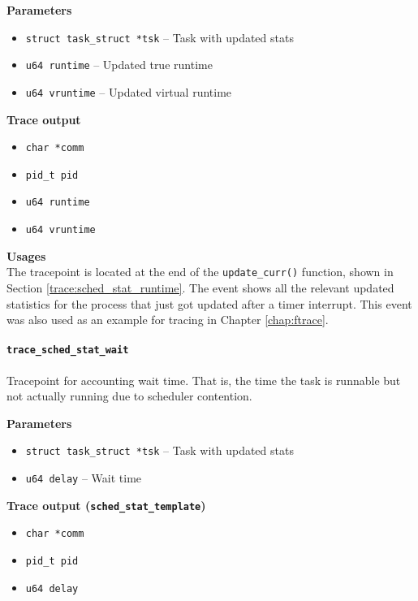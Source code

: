\textbf{Parameters}
\begin{itemize}
    \item \verb|struct task_struct *tsk| -- Task with updated stats
    \item \verb|u64 runtime| -- Updated true runtime
    \item \verb|u64 vruntime| -- Updated virtual runtime
\end{itemize}

\textbf{Trace output}
\begin{itemize}
    \item \verb|char *comm|
    \item \verb|pid_t pid|
    \item \verb|u64 runtime|
    \item \verb|u64 vruntime|
\end{itemize}

\textbf{Usages}\\
The tracepoint is located at the end of the \verb|update_curr()| function, shown in Section \ref{trace:sched_stat_runtime}. The event shows all the relevant updated statistics for the process that just got updated after a timer interrupt. This event was also used as an example for tracing in Chapter \ref{chap:ftrace}.

\paragraph{\texttt{trace\_sched\_stat\_wait}}
Tracepoint for accounting wait time. That is, the time the task is runnable but not actually running due to scheduler contention.

\textbf{Parameters}
\begin{itemize}
    \item \verb|struct task_struct *tsk| -- Task with updated stats
    \item \verb|u64 delay| -- Wait time
\end{itemize}

\textbf{Trace output (\texttt{sched\_stat\_template})}
\begin{itemize}
    \item \verb|char *comm|
    \item \verb|pid_t pid|
    \item \verb|u64 delay|
\end{itemize}

